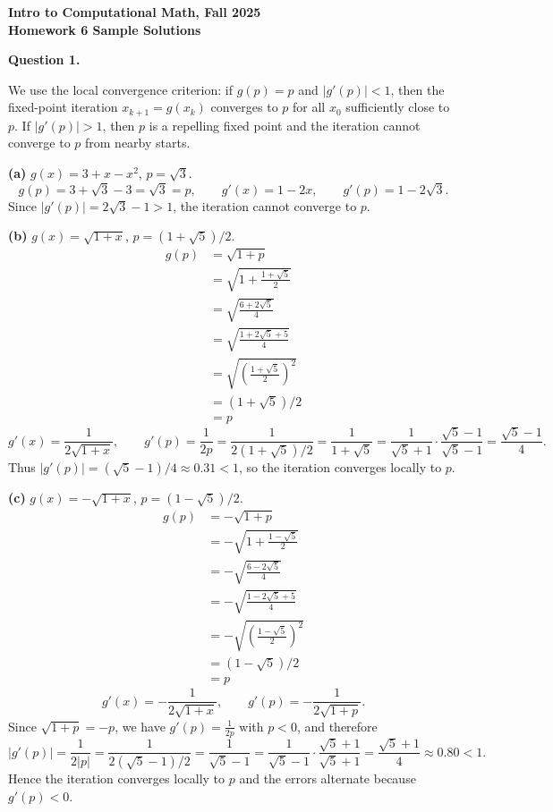 \documentclass[11pt]{article}
\begin{document}
\begin{center}
{\bf Intro to Computational Math, Fall 2025\\
Homework 6 Sample Solutions}
\end{center}

{\bf Question 1.}

We use the local convergence criterion: if \(g(p)=p\) and \(|g'(p)|<1\), then the fixed-point iteration \(x_{k+1}=g(x_k)\) converges to \(p\) for all \(x_0\) sufficiently close to \(p\). If \(|g'(p)|>1\), then \(p\) is a repelling fixed point and the iteration cannot converge to \(p\) from nearby starts.

\vskip1cm
\noindent\textbf{(a)} \(g(x)=3+x-x^2\), \(p=\sqrt{3}\).
\[
g(p)=3+\sqrt{3}-3=\sqrt{3}=p, \qquad
g'(x)=1-2x, \qquad
g'(p)=1-2\sqrt{3}.
\]
Since \(|g'(p)|=2\sqrt{3}-1>1\), the iteration cannot converge to \(p\).

\vskip1cm
\noindent\textbf{(b)} \(g(x)=\sqrt{1+x}\), \(p=(1+\sqrt{5})/2\).
\begin{align*}
    g(p) &= \sqrt{1+p} \\
    &= \sqrt{1 + \frac{1 + \sqrt{5}}{2}} \\
    &= \sqrt{\frac{6 + 2\sqrt{5}}{4}} \\
    &= \sqrt{\frac{1 + 2\sqrt{5} + 5}{4}} \\
    &= \sqrt{\left(\frac{1 + \sqrt{5}}{2}\right)^2} \\
    &= (1 + \sqrt{5})/2 \\
    &= p
\end{align*}
\[
g'(x)= \frac{1}{2\sqrt{1+x}}, \qquad
g'(p)= \frac{1}{2p} = \frac{1}{2(1+\sqrt{5})/2} = \frac{1}{1 + \sqrt{5}} = \frac{1}{\sqrt{5} + 1} \cdot \frac{\sqrt{5} - 1}{\sqrt{5} - 1} = \frac{\sqrt{5}-1}{4}.
\]
Thus \(|g'(p)|=(\sqrt{5}-1)/4 \approx 0.31 <1\), so the iteration converges locally to \(p\).

\vskip1cm
\noindent\textbf{(c)} \(g(x)=-\sqrt{1+x}\), \(p=(1-\sqrt{5})/2\).
\begin{align*}
    g(p) &= -\sqrt{1 + p} \\
    &= -\sqrt{1 + \frac{1 - \sqrt{5}}{2}} \\
    &= -\sqrt{\frac{6 - 2\sqrt{5}}{4}} \\
    &= -\sqrt{\frac{1 - 2\sqrt{5} + 5}{4}} \\
    &= -\sqrt{\left(\frac{1 - \sqrt{5}}{2}\right)^2} \\
    &= (1 - \sqrt{5})/2 \\
    &= p
\end{align*}
\[
g'(x)=-\frac{1}{2\sqrt{1+x}}, \qquad
g'(p)=-\frac{1}{2\sqrt{1+p}}.
\]
Since \(\sqrt{1+p}=-p\), we have \(g'(p)=\frac{1}{2p}\) with \(p<0\), and therefore
\[
|g'(p)|=\frac{1}{2|p|}=\frac{1}{2(\sqrt{5} - 1)/2} = \frac{1}{\sqrt{5} - 1} = \frac{1}{\sqrt{5} - 1} \cdot \frac{\sqrt{5} + 1}{\sqrt{5} + 1} = \frac{\sqrt{5} + 1}{4} \approx 0.80 < 1.
\]
Hence the iteration converges locally to \(p\) and the errors alternate because \(g'(p)<0\).
\end{document}
